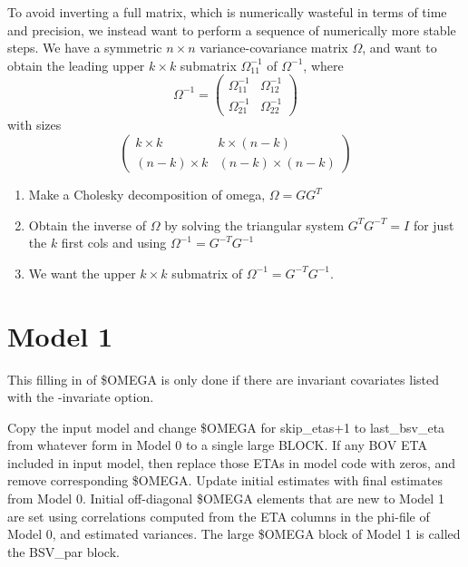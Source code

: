 To avoid inverting a full matrix, which is numerically wasteful in terms of time and precision, we instead want to perform a sequence of numerically more stable steps.
We have a symmetric $n\times n$ variance-covariance matrix $\Omega$, and want to obtain the leading upper $k\times k$ submatrix $\Omega^{-1}_{11}$
of $\Omega^{-1}$, where
\[
\Omega^{-1} = \left( \begin{array}{cc}
\Omega^{-1}_{11} & \Omega^{-1}_{12}\\
\Omega^{-1}_{21} & \Omega^{-1}_{22}
\end{array} \right)
\] with sizes \[
\left(
\begin{array}{cc}
k\times k & k\times (n-k)\\
(n-k)\times k & (n-k)\times (n-k)
\end{array}
\right)
\]
\begin{enumerate}
\item Make a Cholesky decomposition of omega, $\Omega=GG^T$
\item Obtain the inverse of $\Omega$ by solving the triangular system $G^{T}G^{-T}=I$ for just the $k$ first cols and using $\Omega^{-1}=G^{-T}G^{-1}$
\item We want the upper $k\times k$ submatrix of $\Omega^{-1}=G^{-T}G^{-1}$.
\end{enumerate}




\section{Model 1}
This filling in of \$OMEGA is only done if there are invariant covariates listed with the -invariate option.

Copy the input model and change \$OMEGA for skip\_etas+1 to last\_bsv\_eta
from whatever form in Model 0 to a single large BLOCK. If any BOV ETA included in input model,
then replace those ETAs in model code with zeros, and remove corresponding \$OMEGA.
Update initial estimates with final estimates from Model 0.
Initial off-diagonal \$OMEGA elements that are new to Model 1 are set using
correlations computed from the ETA columns in the phi-file of Model 0, and estimated variances.
The large \$OMEGA block of Model 1 is called the BSV\_par block.


